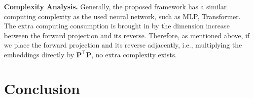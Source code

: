 \documentclass[review]{elsarticle}
\begin{document}
\begin{table}[htbp]
  \centering
  \caption{\textbf{Results of different projection placement.}}
  \label{table: ab-3}
\end{table}

\textbf{Complexity Analysis.} Generally, the proposed framework has a similar computing complexity as the used neural network, such as MLP, Transformer. The extra computing consumption is brought in by the dimension increase between the forward projection and its reverse. Therefore, as mentioned above, if we place the forward projection and its reverse adjacently, i.e., multiplying the embeddings directly by $\mathbf{P}^\top\mathbf{P}$, no extra complexity exists.

\section{Conclusion}
\end{document}
